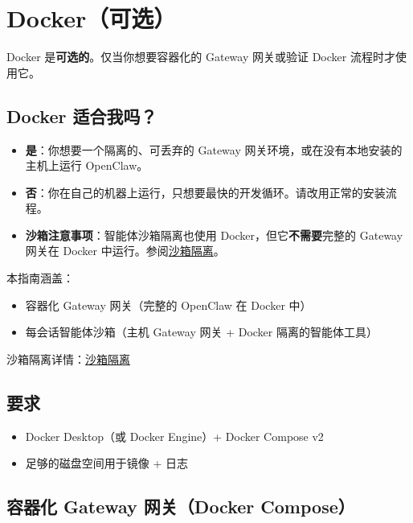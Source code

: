 \clearpage

\section{Docker（可选）}


Docker 是\textbf{可选的}。仅当你想要容器化的 Gateway 网关或验证 Docker 流程时才使用它。

\subsection{Docker 适合我吗？}


\begin{itemize}
  \item \textbf{是}：你想要一个隔离的、可丢弃的 Gateway 网关环境，或在没有本地安装的主机上运行 OpenClaw。
  \item \textbf{否}：你在自己的机器上运行，只想要最快的开发循环。请改用正常的安装流程。
  \item \textbf{沙箱注意事项}：智能体沙箱隔离也使用 Docker，但它\textbf{不需要}完整的 Gateway 网关在 Docker 中运行。参阅\href{/gateway/sandboxing}{沙箱隔离}。
\end{itemize}


本指南涵盖：

\begin{itemize}
  \item 容器化 Gateway 网关（完整的 OpenClaw 在 Docker 中）
  \item 每会话智能体沙箱（主机 Gateway 网关 + Docker 隔离的智能体工具）
\end{itemize}


沙箱隔离详情：\href{/gateway/sandboxing}{沙箱隔离}

\subsection{要求}


\begin{itemize}
  \item Docker Desktop（或 Docker Engine）+ Docker Compose v2
  \item 足够的磁盘空间用于镜像 + 日志
\end{itemize}


\subsection{容器化 Gateway 网关（Docker Compose）}


